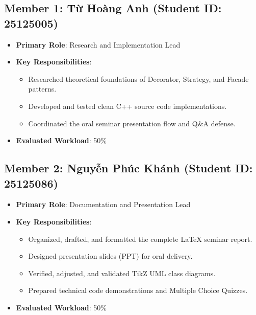 \documentclass[11pt,a4paper]{report}
\begin{document}
\subsection[Member 1: Tu Hoang Anh (Student ID: 25125005)]{Member 1: \foreignlanguage{vietnamese}{Từ Hoàng Anh} (Student ID: 25125005)}
\begin{itemize}
  \item \textbf{Primary Role}: Research and Implementation Lead
  \item \textbf{Key Responsibilities}:
    \begin{itemize}
      \item Researched theoretical foundations of Decorator, Strategy, and Facade patterns.
      \item Developed and tested clean C++ source code implementations.
      \item Coordinated the oral seminar presentation flow and Q\&A defense.
    \end{itemize}
  \item \textbf{Evaluated Workload}: 50\%
\end{itemize}

\subsection[Member 2: Nguyen Phuc Khanh (Student ID: 25125086)]{Member 2: \foreignlanguage{vietnamese}{Nguyễn Phúc Khánh} (Student ID: 25125086)}
\begin{itemize}
  \item \textbf{Primary Role}: Documentation and Presentation Lead
  \item \textbf{Key Responsibilities}:
    \begin{itemize}
      \item Organized, drafted, and formatted the complete \LaTeX{} seminar report.
      \item Designed presentation slides (PPT) for oral delivery.
      \item Verified, adjusted, and validated TikZ UML class diagrams.
      \item Prepared technical code demonstrations and Multiple Choice Quizzes.
    \end{itemize}
  \item \textbf{Evaluated Workload}: 50\%
\end{itemize}
\end{document}
